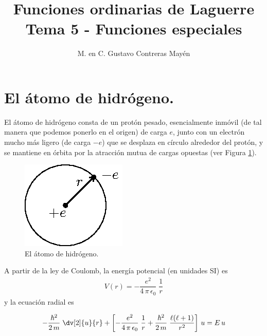 
\usepackage{apacite}
\title{Funciones ordinarias de Laguerre \\ \large {Tema 5 - Funciones especiales} \vspace{-3ex}}
\author{M. en C. Gustavo Contreras Mayén}
\date{ }

\vspace{-4cm}
\maketitle
\fontsize{14}{14}\selectfont
\tableofcontents
\newpage
\section{El átomo de hidrógeno.}
El átomo de hidrógeno consta de un protón pesado, esencialmente inmóvil (de tal manera que podemos ponerlo en el origen) de carga $e$, junto con un electrón mucho más ligero (de carga $-e$) que se desplaza en círculo alrededor del protón, y se mantiene en órbita por la atracción mutua de cargas opuestas (ver Figura \ref{fig:figura_01}).
\begin{figure}[H]
    \centering
    \includegraphics[scale=1.5]{Imagenes/atomohidrogeno.eps}
    \caption{El átomo de hidrógeno.}
    \label{fig:figura_01}
\end{figure}
A partir de la ley de Coulomb, la energía potencial (en unidades SI) es
\begin{align}
V(r) = - \dfrac{e^{2}}{4 \, \pi \, \epsilon_{0}} \; \dfrac{1}{r}
\label{eq:ecuacion_04_52}
\end{align}
y la ecuación radial es

\begin{align}
- \dfrac{\hbar^{2}}{2 \, m} \; \dv[2]{u}{r} + \left[ - \dfrac{e^{2}}{4 \, \pi \, \epsilon_{0}} \; \dfrac{1}{r} + \dfrac{\hbar^{2}}{2 \, m} \; \dfrac{\ell(\ell +1)}{r^{2}} \right] \, u =  E \, u
\label{eq:ecuacion_04_53}
\end{align}

